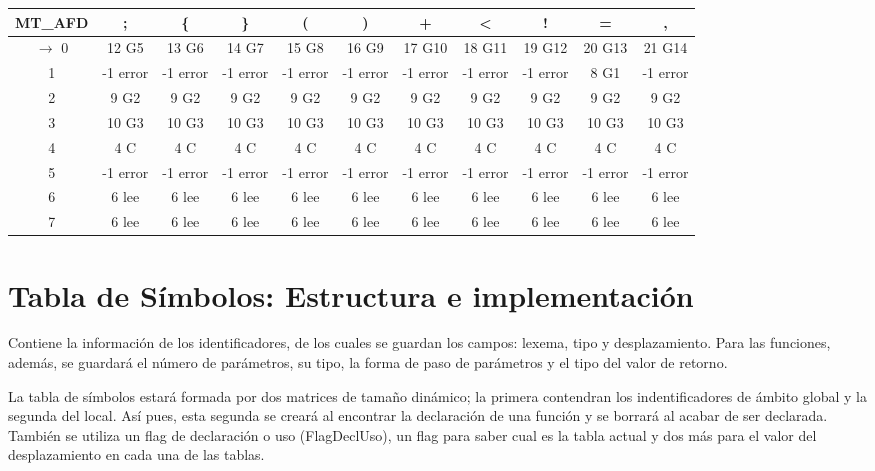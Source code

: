 \documentclass[a4paper, 12pt]{article}
\begin{document}
\hspace*{-70pt} \begin{tabular}{|c|c|c|c|c|c|c|c|c|c|c|}
\hline
    \textbf{MT\_AFD}    & \textbf{;}  & \textbf{\{}     & \textbf{\}}     & \textbf{(}     & \textbf{)}     & \textbf{+}     & \textbf{\textless}     & \textbf{!}     & \textbf{=}     & \textbf{,} \\
\hline
$\rightarrow$ 0 & 12 G5 & 13 G6 & 14 G7 & 15 G8 & 16 G9 & 17 G10 & 18 G11 & 19 G12 & 20 G13 & 21 G14 \\
\hline
    1  & -1 error & -1 error & -1 error & -1 error & -1 error & -1 error & -1 error & -1 error & 8 G1  & -1 error \\
\hline
    2 & 9 G2 & 9 G2  & 9 G2  & 9 G2  & 9 G2  & 9 G2  & 9 G2  & 9 G2  & 9 G2  & 9 G2 \\
\hline
    3 & 10 G3 & 10 G3 & 10 G3 & 10 G3 & 10 G3 & 10 G3 & 10 G3 & 10 G3 & 10 G3 & 10 G3 \\
\hline
    4 & 4 C & 4 C   & 4 C   & 4 C   & 4 C   & 4 C   & 4 C   & 4 C   & 4 C   & 4 C \\
\hline
    5 & -1 error & -1 error & -1 error & -1 error & -1 error & -1 error & -1 error & -1 error & -1 error & -1 error \\
\hline
    6 & 6 lee & 6 lee & 6 lee & 6 lee & 6 lee & 6 lee & 6 lee & 6 lee & 6 lee & 6 lee \\
\hline
    7 & 6 lee & 6 lee & 6 lee & 6 lee & 6 lee & 6 lee & 6 lee & 6 lee & 6 lee & 6 lee \\
\hline
    \end{tabular}\hspace{-70pt}

    
\section{Tabla de Símbolos: Estructura e implementación}
Contiene la información de los identificadores, de los cuales se guardan los campos: lexema, tipo y desplazamiento.
Para las funciones, además, se guardará el número de parámetros, su tipo, la forma de paso de parámetros y el tipo del valor de retorno.

La tabla de símbolos estará formada por dos matrices de tamaño dinámico; la primera contendran los indentificadores de ámbito global y la segunda del local. Así pues, esta segunda se creará al encontrar la declaración de una función y se borrará al acabar de ser declarada. También se utiliza un flag de declaración o uso (FlagDeclUso), un flag para saber cual es la tabla actual y dos más para el valor del desplazamiento en cada una de las tablas.
\end{document}
